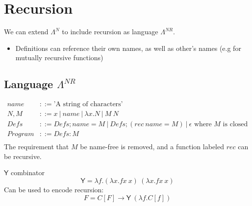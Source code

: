 \chapter{Recursion}
We can extend $\Lambda^N$ to include recursion as language $\Lambda^{NR}$.
\begin{itemize}
    \item Definitions can reference their own names, as well as other's names (e.g for mutually recursive functions)
\end{itemize}

\section{Language $\Lambda^{NR}$}
\[\begin{split}
    name & ::= \text{'A string of characters'} \\
    N, M & ::= x \ | \ name \ | \ \lambda x. N \ | \ M \ N \\
    Defs & ::= Defs ; name = M \ | \ Defs ; (rec \ name = M) \ | \ \epsilon \text{ where } M \text{ is closed}\\ 
    Program & ::= Defs : M \\
\end{split}\]
The requirement that $M$ be name-free is removed, and a function labeled $rec$ can be recursive.

\begin{definitionbox}{$\mathsf{Y}$ combinator}
    \[\mathsf{Y} = \lambda f . (\lambda x . f x \ x) \ (\lambda x . f x \ x)\]
    Can be used to encode recursion:
    \[F = C [F] \to \mathsf{Y} \ (\lambda f . C [f]) \]
\end{definitionbox}

